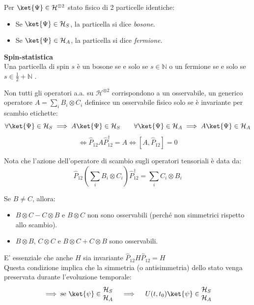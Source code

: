 \begin{definition}
    Per \(\ket{\Psi} \in \mathcal{H}^{\otimes 2}\) stato fisico di 2 particelle identiche:
    \begin{itemize}
        \item Se \(\ket{\Psi}\in \mathcal{H}_S\), la particella si dice \textit{bosone}.
        \item Se \(\ket{\Psi}\in \mathcal{H}_A\), la particella si dice \textit{fermione}.
    \end{itemize}
\end{definition}

\begin{theorem}
    { \normalfont \textbf{Spin-statistica}}\\
    Una particella di spin \(s \) è un bosone se e solo se \(s \in \mathbb{N}\) o un fermione se e solo se \(s \in \frac{1}{2} + \mathbb{N}\) .
\end{theorem}


Non tutti gli operatori a.a. su \(\mathcal{H}^{\otimes 2}\) corrispondono a un osservabile, un generico operatore \(A = \sum_i B_i\otimes C_i\) definisce un osservabile fisico solo se è invariante per scambio etichette:
\[
    \forall \ket{\Psi} \in \mathcal{H}_S \implies A\ket{\Psi} \in \mathcal{H}_S \qquad 
    \forall \ket{\Psi} \in \mathcal{H}_A \implies A\ket{\Psi} \in \mathcal{H}_A 
\]
\[
    \iff \hat{P}_{12} A \hat{P}^\dagger_{12} = A \iff \left[ A, \hat{P}_{12} \right]=0
\]

\begin{remark}
    Nota che l'azione dell'operatore di scambio sugli operatori tensoriali è data da:
    \[
    \hat{P}_{12} \left( \sum_{i} B_i \otimes C_i \right) \hat{P}_{12}^\dagger = \sum_{i} C_i \otimes B_i
    \]
\end{remark}
\begin{example}
    Se \( B \neq C \), allora:
    \begin{itemize}
        \item \( B \otimes C - C \otimes B \) e \( B \otimes C \) non sono osservabili (perché non simmetrici rispetto allo scambio).
        \item \( B \otimes B \), \( C \otimes C \) e \( B \otimes C + C \otimes B \) sono osservabili.
    \end{itemize}
\end{example}

\begin{remark}
    E' essenziale che anche $H$ sia invariante \quad $\hat{P}_{12} H \hat{P}_{12} = H$\\
    Questa condizione implica che la simmetria (o antisimmetria) dello stato venga preservata durante l'evoluzione temporale:
    \[
    \implies \text{se } \ket{\psi} \in 
    \begin{matrix}
        \mathcal{H}_S \\ \mathcal{H}_A
    \end{matrix} 
    \quad \implies \quad 
    U(t, t_0)\ket{\psi} \in 
    \begin{matrix}
        \mathcal{H}_S \\ \mathcal{H}_A
    \end{matrix}
    \]
\end{remark}

